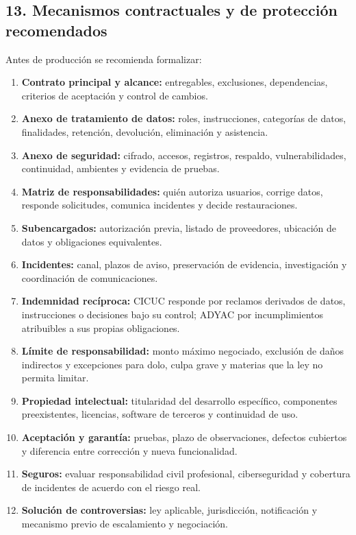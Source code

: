 \documentclass[
]{article}
\providecommand{\tightlist}{%
  \setlength{\itemsep}{0pt}\setlength{\parskip}{0pt}}
\begin{document}
\hypertarget{13-mecanismos-contractuales-y-de-protecciuxf3n-recomendados}{%
\subsection{13. Mecanismos contractuales y de protección
recomendados}\label{13-mecanismos-contractuales-y-de-protecciuxf3n-recomendados}}

Antes de producción se recomienda formalizar:

\begin{enumerate}
\def\labelenumi{\arabic{enumi}.}
\tightlist
\item
  \textbf{Contrato principal y alcance:} entregables, exclusiones,
  dependencias, criterios de aceptación y control de cambios.
\item
  \textbf{Anexo de tratamiento de datos:} roles, instrucciones,
  categorías de datos, finalidades, retención, devolución, eliminación y
  asistencia.
\item
  \textbf{Anexo de seguridad:} cifrado, accesos, registros, respaldo,
  vulnerabilidades, continuidad, ambientes y evidencia de pruebas.
\item
  \textbf{Matriz de responsabilidades:} quién autoriza usuarios, corrige
  datos, responde solicitudes, comunica incidentes y decide
  restauraciones.
\item
  \textbf{Subencargados:} autorización previa, listado de proveedores,
  ubicación de datos y obligaciones equivalentes.
\item
  \textbf{Incidentes:} canal, plazos de aviso, preservación de
  evidencia, investigación y coordinación de comunicaciones.
\item
  \textbf{Indemnidad recíproca:} CICUC responde por reclamos derivados
  de datos, instrucciones o decisiones bajo su control; ADYAC por
  incumplimientos atribuibles a sus propias obligaciones.
\item
  \textbf{Límite de responsabilidad:} monto máximo negociado, exclusión
  de daños indirectos y excepciones para dolo, culpa grave y materias
  que la ley no permita limitar.
\item
  \textbf{Propiedad intelectual:} titularidad del desarrollo específico,
  componentes preexistentes, licencias, software de terceros y
  continuidad de uso.
\item
  \textbf{Aceptación y garantía:} pruebas, plazo de observaciones,
  defectos cubiertos y diferencia entre corrección y nueva
  funcionalidad.
\item
  \textbf{Seguros:} evaluar responsabilidad civil profesional,
  ciberseguridad y cobertura de incidentes de acuerdo con el riesgo
  real.
\item
  \textbf{Solución de controversias:} ley aplicable, jurisdicción,
  notificación y mecanismo previo de escalamiento y negociación.
\end{enumerate}
\end{document}
